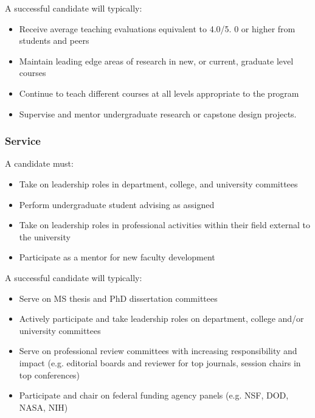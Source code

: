 A successful candidate will typically:

\begin{itemize}
\item Receive average teaching evaluations equivalent to 4.0/5. 0 or higher from students and peers
\item Maintain leading edge areas of research in new, or current, graduate level courses
\item Continue to teach different courses at all levels appropriate to the program
\item Supervise and mentor undergraduate research or capstone design projects.
\end{itemize}


\subsubsection*{Service}

A candidate must:

\begin{itemize}
\item Take on leadership roles in department, college, and university committees
\item Perform undergraduate student advising as assigned
\item Take on leadership roles in professional activities within their field external to the university
\item Participate as a mentor for new faculty development
\end{itemize}

 A successful candidate will typically:

\begin{itemize}
\item Serve on MS thesis and PhD dissertation committees
\item Actively participate and take leadership roles on department, college and/or university committees
\item Serve on professional review committees with increasing responsibility and impact (e.g. editorial boards and reviewer for top journals, session chairs in top conferences)
\item Participate and chair on federal funding agency panels (e.g. NSF, DOD, NASA, NIH)
\end{itemize}

